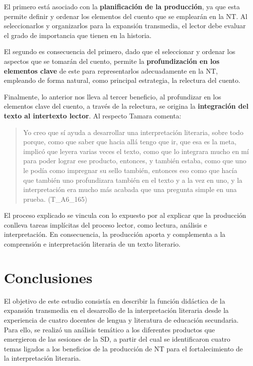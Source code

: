 \documentclass[spanish]{textolivre}
\begin{document}
El primero está asociado con la\textbf{ planificación de la producción}, ya que esta permite definir y ordenar los elementos del cuento que se emplearán en la NT. Al seleccionarlos y organizarlos para la expansión transmedia, el lector debe evaluar el grado de importancia que tienen en la historia.  

El segundo es consecuencia del primero, dado que el seleccionar y ordenar los aspectos que se tomarán del cuento, permite la \textbf{profundización en los elementos clave} de este para representarlos adecuadamente en la NT, empleando de forma natural, como principal estrategia, la relectura del cuento. 

Finalmente, lo anterior nos lleva al tercer beneficio, al profundizar en los elementos clave del cuento, a través de la relectura, se origina la \textbf{integración del texto al intertexto lector}. Al respecto Tamara comenta: 

\begin{quote}
    Yo creo que sí ayuda a desarrollar una interpretación literaria, sobre todo porque, como que saber que hacia allá tengo que ir, que esa es la meta, implicó que leyera varias veces el texto, como que lo integrara mucho en mí para poder lograr ese producto, entonces, y también estaba, como que uno le podía como impregnar su sello también, entonces eso como que hacía que también uno profundizara también en el texto y a la vez en uno, y la interpretación era mucho más acabada que una pregunta simple en una prueba. (T\_A6\_165)
\end{quote}

El proceso explicado se vincula con lo expuesto por \textcite{cassany_taller_2006} al explicar que la producción conlleva tareas implícitas del proceso lector, como lectura, análisis e interpretación. En consecuencia, la producción aporta y complementa a la comprensión e interpretación literaria de un texto literario.

\section{Conclusiones}\label{sec-links}
El objetivo de este estudio consistía en describir la función didáctica de la expansión transmedia en el desarrollo de la interpretación literaria desde la experiencia de cuatro docentes de lengua y literatura de educación secundaria. Para ello, se realizó un análisis temático a los diferentes productos que emergieron de las sesiones de la SD, a partir del cual se identificaron cuatro temas ligados a los beneficios de la producción de NT para el fortalecimiento de la interpretación literaria. 
\end{document}
